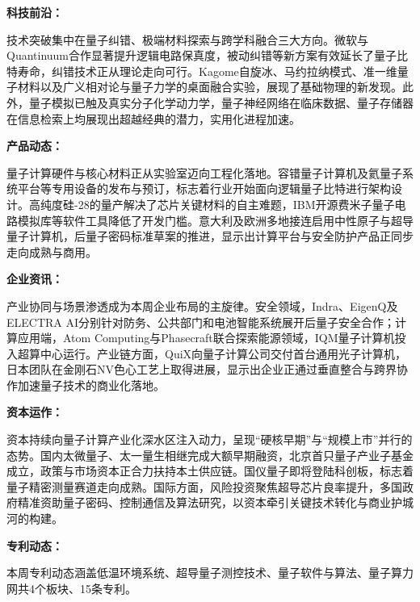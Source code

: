 \documentclass[12pt,a4paper]{ctexart}
\begin{document}
\textbf{ 科技前沿：}

技术突破集中在量子纠错、极端材料探索与跨学科融合三大方向。微软与Quantinuum合作显著提升逻辑电路保真度，被动纠错等新方案有效延长了量子比特寿命，纠错技术正从理论走向可行。Kagome自旋冰、马约拉纳模式、准一维量子材料以及广义相对论与量子力学的桌面融合实验，展现了基础物理的新发现。此外，量子模拟已触及真实分子化学动力学，量子神经网络在临床数据、量子存储器在信息检索上均展现出超越经典的潜力，实用化进程加速。


\textbf{ 产品动态：}

量子计算硬件与核心材料正从实验室迈向工程化落地。容错量子计算机及氦量子系统平台等专用设备的发布与预订，标志着行业开始面向逻辑量子比特进行架构设计。高纯度硅-28的量产解决了芯片关键材料的自主难题，IBM开源费米子量子电路模拟库等软件工具降低了开发门槛。意大利及欧洲多地接连启用中性原子与超导量子计算机，后量子密码标准草案的推进，显示出计算平台与安全防护产品正同步走向成熟与商用。


\textbf{ 企业资讯：}

产业协同与场景渗透成为本周企业布局的主旋律。安全领域，Indra、EigenQ及ELECTRA AI分别针对防务、公共部门和电池智能系统展开后量子安全合作；计算应用端，Atom Computing与Phasecraft联合探索能源领域，IQM量子计算机投入超算中心运行。产业链方面，QuiX向量子计算公司交付首台通用光子计算机，日本团队在金刚石NV色心工艺上取得进展，显示出企业正通过垂直整合与跨界协作加速量子技术的商业化落地。


\textbf{ 资本运作：}

资本持续向量子计算产业化深水区注入动力，呈现“硬核早期”与“规模上市”并行的态势。国内太微量子、太一量生相继完成大额早期融资，北京首只量子产业子基金成立，政策与市场资本正合力扶持本土供应链。国仪量子即将登陆科创板，标志着量子精密测量赛道走向成熟。国际方面，风险投资聚焦超导芯片良率提升，多国政府精准资助量子密码、控制通信及算法研究，以资本牵引关键技术转化与商业护城河的构建。




\textbf{ 专利动态：}

本周专利动态涵盖低温环境系统、超导量子测控技术、量子软件与算法、量子算力网共4个板块、15条专利。
\end{document}
